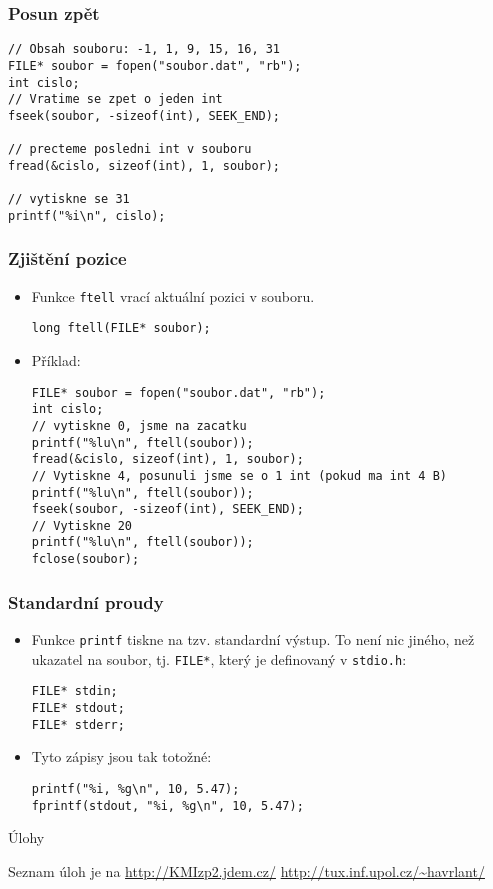 \documentclass{beamer}
\newenvironment{itemizex}%
  {\large \begin{itemize}%
    \setlength{\itemsep}{8pt}%
    \setlength{\parskip}{8pt}}%
  {\end{itemize}}
\begin{document}
\begin{frame}[t,fragile]\frametitle{Posun zpět} 
\begin{verbatim} 
// Obsah souboru: -1, 1, 9, 15, 16, 31
FILE* soubor = fopen("soubor.dat", "rb");
int cislo;
// Vratime se zpet o jeden int
fseek(soubor, -sizeof(int), SEEK_END);

// precteme posledni int v souboru
fread(&cislo, sizeof(int), 1, soubor);

// vytiskne se 31
printf("%i\n", cislo);
\end{verbatim}
\end{frame}


\begin{frame}[t,fragile]\frametitle{Zjištění pozice} 
    \begin{itemize}
        \item Funkce \texttt{ftell} vrací aktuální pozici v souboru.
\begin{verbatim} 
long ftell(FILE* soubor);
\end{verbatim}
        \item Příklad:
\begin{verbatim} 
FILE* soubor = fopen("soubor.dat", "rb");
int cislo;
// vytiskne 0, jsme na zacatku
printf("%lu\n", ftell(soubor));
fread(&cislo, sizeof(int), 1, soubor);
// Vytiskne 4, posunuli jsme se o 1 int (pokud ma int 4 B)
printf("%lu\n", ftell(soubor));
fseek(soubor, -sizeof(int), SEEK_END);
// Vytiskne 20
printf("%lu\n", ftell(soubor));
fclose(soubor);
\end{verbatim}
    \end{itemize}
\end{frame}


\begin{frame}[t,fragile]\frametitle{Standardní proudy} 
    \begin{itemizex}
        \item Funkce \texttt{printf} tiskne na tzv. standardní výstup. To není nic jiného, než ukazatel na soubor, tj. \texttt{FILE*}, který je definovaný v \texttt{stdio.h}:
\begin{verbatim} 
FILE* stdin;
FILE* stdout;
FILE* stderr;
\end{verbatim}
        \item Tyto zápisy jsou tak totožné:
\begin{verbatim} 
printf("%i, %g\n", 10, 5.47);
fprintf(stdout, "%i, %g\n", 10, 5.47);
\end{verbatim}
    \end{itemizex}
\end{frame}



\begin{frame}[t,fragile]{Úlohy}
\begin{center}
\vskip 1cm
{\Large Seznam úloh je na \url{http://KMIzp2.jdem.cz/}}
\vskip 2cm
\url{http://tux.inf.upol.cz/~havrlant/}
\end{center}
\end{frame}
\end{document}
